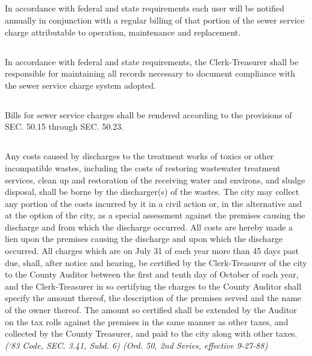 \subsection{}
In accordance with federal and state requirements each user will be notified annually in conjunction with a regular billing of that portion of the sewer service charge attributable to operation, maintenance and replacement.
\subsection{}
In accordance with federal and state requirements, the Clerk-Treasurer shall be responsible for maintaining all records necessary to document compliance with the sewer service charge system adopted.
\subsection{}
Bills for sewer service charges shall be rendered according to the provisions of SEC. 50.15 through SEC. 50.23.
\subsection{}
Any costs caused by discharges to the treatment works of toxics or other incompatible wastes, including the costs of restoring wastewater treatment services, clean up and restoration of the receiving water and environs, and sludge disposal, shall be borne by the discharger(s) of the wastes.  The city may collect any portion of the costs incurred by it in a civil action or, in the alternative and at the option of the city, as a special assessment against the premises causing the discharge and from which the discharge occurred. All costs are hereby made a lien upon the premises causing the discharge and upon which the discharge occurred. All charges which are on July 31 of each year more than 45 days past due, shall, after notice and hearing, be certified by the Clerk-Treasurer of the city to the County Auditor between the first and tenth day of October of each year, and the Clerk-Treasurer in so certifying the charges to the County Auditor shall specify the amount thereof, the description of the premises served and the name of the owner thereof. The amount so certified shall be extended by the Auditor on the tax rolls against the premises in the same manner as other taxes, and collected by the County Treasurer, and paid to the city along with other taxes.\\
\emph{(‘83 Code, SEC. 3.41, Subd. 6) (Ord. 50, 2nd Series, effective 9-27-88)}\\

